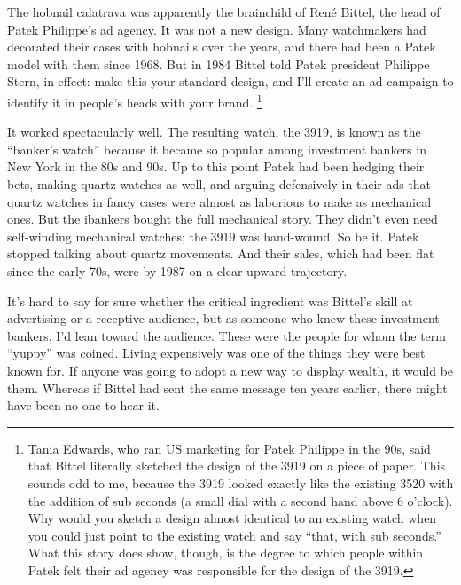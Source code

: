 \documentclass[12pt]{book}
\begin{document}
The hobnail calatrava was apparently the brainchild of René Bittel, the
head of Patek Philippe's ad agency. It was not a new design. Many
watchmakers had decorated their cases with hobnails over the years, and
there had been a Patek model with them since 1968. But in 1984 Bittel
told Patek president Philippe Stern, in effect: make this your standard
design, and I'll create an ad campaign to identify it in people's heads
with your brand. \footnote{Tania Edwards, who ran US marketing for Patek Philippe in the
90s, said that Bittel literally sketched the design of the 3919 on a
piece of paper. This sounds odd to me, because the 3919 looked exactly
like the existing 3520 with the addition of sub seconds (a small dial
with a second hand above 6 o'clock). Why would you sketch a design
almost identical to an existing watch when you could just point to the
existing watch and say ``that, with sub seconds.'' What this story does
show, though, is the degree to which people within Patek felt their ad
agency was responsible for the design of the 3919.}

It worked spectacularly well. The resulting watch, the
\href{https://www.sothebys.com/en/buy/auction/2019/watches-online-6/patek-philippe-ref-3919j-a-yellow-gold-wristwatch/}{3919},
is known as the ``banker's watch'' because it became so popular among
investment bankers in New York in the 80s and 90s. Up to this point
Patek had been hedging their bets, making quartz watches as well, and
arguing defensively in their ads that quartz watches in fancy cases were
almost as laborious to make as mechanical ones. But the ibankers bought
the full mechanical story. They didn't even need self-winding mechanical
watches; the 3919 was hand-wound. So be it. Patek stopped talking about
quartz movements. And their sales, which had been flat since the early
70s, were by 1987 on a clear upward trajectory.

It's hard to say for sure whether the critical ingredient was Bittel's
skill at advertising or a receptive audience, but as someone who knew
these investment bankers, I'd lean toward the audience. These were the
people for whom the term ``yuppy'' was coined. Living expensively was
one of the things they were best known for. If anyone was going to adopt
a new way to display wealth, it would be them. Whereas if Bittel had
sent the same message ten years earlier, there might have been no one to
hear it.
\end{document}
